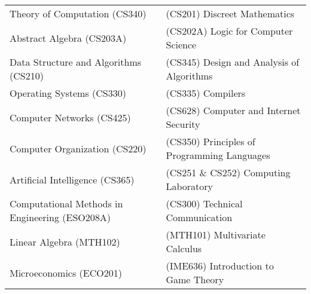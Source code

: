 \documentclass[a4paper,10pt]{article} %
\begin{document}
\begin{center}
    \begin{tabular}{>{\raggedleft}p{8cm}|p{8cm}}

        Theory of Computation (CS340) & (CS201) Discreet Mathematics \\
        Abstract Algebra (CS203A) & (CS202A) Logic for Computer Science \\
        Data Structure and Algorithms (CS210) & (CS345) Design and Analysis of Algorithms \\
        Operating Systems (CS330) & (CS335) Compilers \\
        Computer Networks (CS425) &  (CS628) Computer and Internet Security \\
        Computer Organization (CS220) & (CS350) Principles of Programming Languages \\
        Artificial Intelligence (CS365) & (CS251 \& CS252) Computing Laboratory \\
        Computational Methods in Engineering (ESO208A) & (CS300) Technical Communication \\
        Linear Algebra (MTH102) &  (MTH101) Multivariate Calculus \\
        Microeconomics (ECO201) & (IME636) Introduction to Game Theory \\
    \end{tabular}
\end{center}
\end{document}
